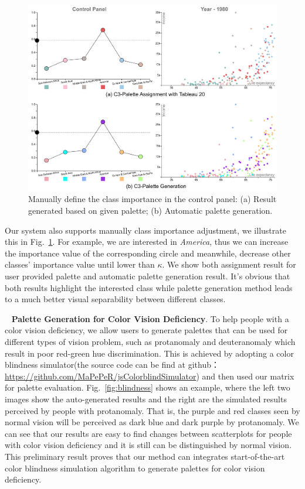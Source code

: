 \documentclass[review,onecolumn]{vgtc}                %
\newcommand{\myparagraph}[1]{\mbox{\ } \newline \noindent \textbf{#1}}
\renewcommand{\paragraph}[1]{\myparagraph{#1}}
\begin{document}
\begin{figure}[h]
\centering
\includegraphics[width=0.8\linewidth]{interaction.pdf}
\caption{Manually define the class importance in the control panel: (a) Result generated based on given palette; (b) Automatic palette generation.}
\label{fig:casestudyinteraction}
\vspace{-4mm}
\end{figure}

Our system also supports manually class importance adjustment, we illustrate this in Fig.~\ref{fig:casestudyinteraction}. For example, we are interested in \emph{America}, thus we can increase the importance value of the corresponding circle and meanwhile, decrease other classes' importance value until lower than $\kappa$. We show both assignment result for user provided palette and automatic palette generation result. It's obvious that both results highlight the interested class while palette generation method leads to a much better visual separability between different classes.

\paragraph{Palette Generation for Color Vision Deficiency}.
To help people with a color vision deficiency, we allow users to generate palettes that can be used for different types of vision problem, such as protanomaly and deuteranomaly which result in poor red-green hue discrimination. This is achieved by adopting a color blindness simulator(the source code can be find at github： \url{https://github.com/MaPePeR/jsColorblindSimulator}) and then used our matrix for palette evaluation. Fig.~\ref{fig:blindness} shows an example, where the left two images show the auto-generated results and the right are the simulated results perceived by people with protanomaly. That is, the purple and red classes seen by normal vision will be perceived as dark blue and dark purple by protanomaly. We can see that our results are easy to find changes between scatterplots for people with color vision deficiency and it is still can be distinguished by normal vision. This preliminary result proves that our method can integrates start-of-the-art color blindness simulation algorithm to generate palettes for color vision deficiency.
\end{document}
